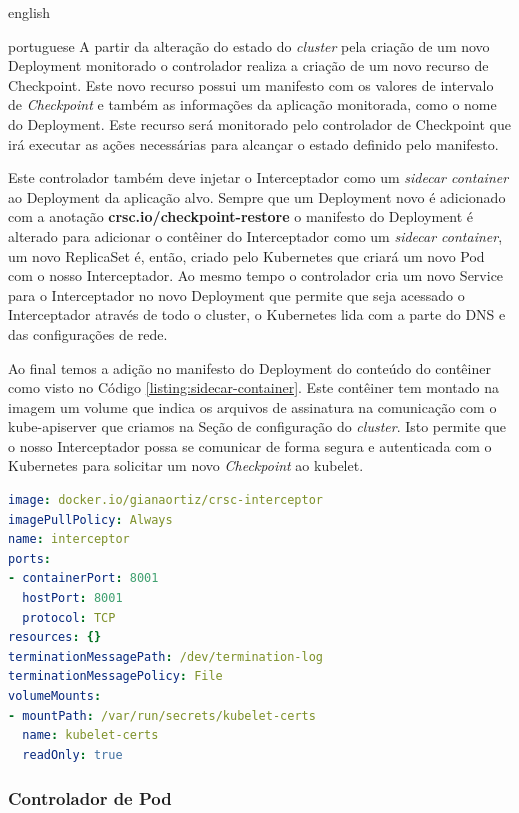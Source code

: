 \begin{otherlanguage*}{english}
\begin{otherlanguage*}{portuguese}
A partir da alteração do estado do \textit{cluster} pela criação de um novo Deployment
monitorado o controlador realiza a criação de um novo recurso de Checkpoint. Este novo
recurso possui um manifesto com os valores de intervalo de \textit{Checkpoint} e também
as informações da aplicação monitorada, como o nome do Deployment. Este recurso será 
monitorado pelo controlador de Checkpoint que irá executar as ações necessárias para
alcançar o estado definido pelo manifesto.

Este controlador também deve injetar o Interceptador como um \textit{sidecar container}
ao Deployment da aplicação alvo. Sempre que um Deployment novo é adicionado com a 
anotação \textbf{crsc.io/checkpoint-restore} o manifesto do Deployment é alterado
para adicionar o contêiner do Interceptador como um \textit{sidecar container}, um novo
ReplicaSet é, então, criado pelo Kubernetes que criará um novo Pod com o nosso
Interceptador. Ao mesmo tempo o controlador cria um novo Service para o Interceptador no
novo Deployment que permite que seja acessado o Interceptador através de todo o cluster,
o Kubernetes lida com a parte do DNS e das configurações de rede.

Ao final temos a adição no manifesto do Deployment do conteúdo do contêiner como visto no
Código \ref{listing:sidecar-container}. Este contêiner tem montado na imagem um volume
que indica os arquivos de assinatura na comunicação com o kube-apiserver que criamos na
Seção de configuração do \textit{cluster}. Isto permite que o nosso Interceptador possa
se comunicar de forma segura e autenticada com o Kubernetes para solicitar um novo
\textit{Checkpoint} ao kubelet.

\begin{lstlisting}[language=yaml,caption={Configuração do Interceptador para o Deployment da aplicação alvo como sidecar container.},label={listing:sidecar-container}]
image: docker.io/gianaortiz/crsc-interceptor
imagePullPolicy: Always
name: interceptor
ports:
- containerPort: 8001
  hostPort: 8001
  protocol: TCP
resources: {}
terminationMessagePath: /dev/termination-log
terminationMessagePolicy: File
volumeMounts:
- mountPath: /var/run/secrets/kubelet-certs
  name: kubelet-certs
  readOnly: true
\end{lstlisting}

\subsubsection{Controlador de Pod}


\end{otherlanguage*}
\end{otherlanguage*}
